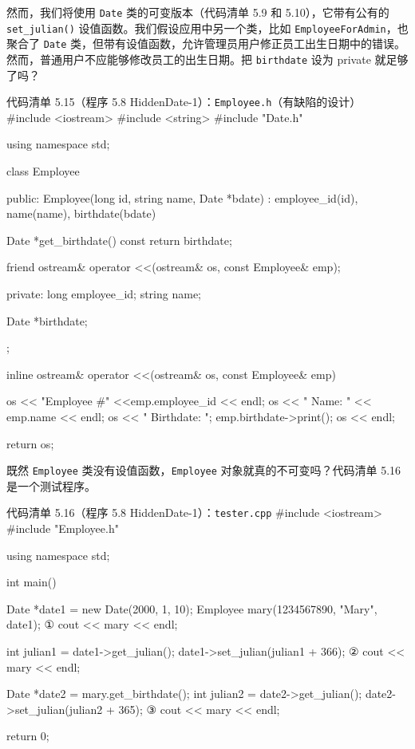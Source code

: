 然而，我们将使用 \texttt{Date} 类的可变版本（代码清单 5.9 和 5.10），它带有公有的 \texttt{set\_\allowbreak{}julian(\allowbreak{})\allowbreak{}} 设值函数。我们假设应用中另一个类，比如 \texttt{Employee\allowbreak{}For\allowbreak{}Admin}，也聚合了 \texttt{Date} 类，但带有设值函数，允许管理员用户修正员工出生日期中的错误。然而，普通用户不应能够修改员工的出生日期。把 \texttt{birthdate} 设为 private 就足够了吗？

\begin{codeboxt}{代码清单 5.15（程序 5.8 HiddenDate-1）：\texttt{Employee.\allowbreak{}h}（有缺陷的设计）}
#include <iostream>
#include <string>
#include "Date.h"

using namespace std;

class Employee
{
public:
    Employee(long id, string name, Date *bdate)
        : employee_id(id), name(name), birthdate(bdate) {}

    Date *get_birthdate() const { return birthdate; }

    friend ostream& operator <<(ostream& os, const Employee& emp);

private:
    long employee_id;
    string name;

    Date *birthdate;
};

inline ostream& operator <<(ostream& os, const Employee& emp)
{
    os << "Employee #" <<emp.employee_id << endl;
    os << "  Name: " << emp.name << endl;
    os << "  Birthdate: "; emp.birthdate->print(); os << endl;

    return os;
}
\end{codeboxt}

既然 \texttt{Employee} 类没有设值函数，\texttt{Employee} 对象就真的不可变吗？代码清单 5.16 是一个测试程序。

\begin{codeboxt}{代码清单 5.16（程序 5.8 HiddenDate-1）：\texttt{tester.\allowbreak{}cpp}}
#include <iostream>
#include "Employee.h"

using namespace std;

int main()
{
    Date *date1 = new Date(2000, 1, 10);
    Employee mary(1234567890, "Mary", date1);     ①
    cout << mary << endl;

    int julian1 = date1->get_julian();
    date1->set_julian(julian1 + 366);             ②
    cout << mary << endl;

    Date *date2 = mary.get_birthdate();
    int julian2 = date2->get_julian();
    date2->set_julian(julian2 + 365);             ③
    cout << mary << endl;

    return 0;
}
\end{codeboxt}
\par
{}\par
{}\par

